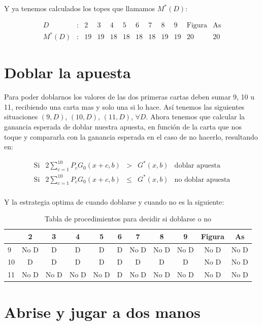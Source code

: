 \documentclass[12pt,a4paper,]{book}
\numberwithin{dummy}{section}
\theoremstyle{ocrenumbox}
\theoremstyle{blacknumex}
\theoremstyle{blacknumbox}
\theoremstyle{ocrenum}
\theoremstyle{ocrenum}
\begin{document}
Y ya tenemos calculados los topes que llamamos \(M^*(D)\):

\[
\begin{array}{cccccccccccc}
D & : & 2 & 3 & 4 & 5 & 6 & 7 & 8 & 9 & \text{Figura} & \text{As} \\
\hline
M^*(D) & : & 19 & 19 & 18 & 18 & 18 & 18 & 19 & 19 & 20 & 20
\end{array}
\]

\hypertarget{Seccion43}{%
\section{Doblar la apuesta}\label{Seccion43}}

Para poder doblarnos los valores de las dos primeras cartas deben sumar
9, 10 u 11, recibiendo una carta mas y solo una si lo hace. Así tenemos
las siguientes situaciones \((9,D)\), \((10,D)\), \((11,D)\),
\(\forall D\). Ahora tenemos que calcular la ganancia esperada de doblar
nuestra apuesta, en función de la carta que nos toque y compararla con
la ganancia esperada en el caso de no hacerlo, resultando en:

\[
\begin{array}{cllll}
\text{Si} & 2 \sum_{c=1}^{10}P_cG_0(x+c,b) & > & G^*(x,b) & \text{doblar apuesta} \\
\text{Si} & 2 \sum_{c=1}^{10}P_cG_0(x+c,b) & \leq & G^*(x,b) & \text{no doblar apuesta}\\
\end{array}
\]

Y la estrategia optima de cuando doblarse y cuando no es la siguiente:

\begingroup\fontsize{12}{14}\selectfont

\begin{longtable}[t]{lcccccccccc}
\caption{\label{tab:unnamed-chunk-9}Tabla de procedimientos para decidir si doblarse o no}\\
\toprule
 & 2 & 3 & 4 & 5 & 6 & 7 & 8 & 9 & Figura & As\\
\midrule
9 & No D & D & D & D & D & No D & No D & No D & No D & No D\\
10 & D & D & D & D & D & D & D & D & No D & No D\\
11 & No D & No D & No D & No D & D & No D & No D & No D & No D & No D\\
\bottomrule
\end{longtable}
\endgroup{}

\hypertarget{Seccion44}{%
\section{Abrise y jugar a dos manos}\label{Seccion44}}
\end{document}
